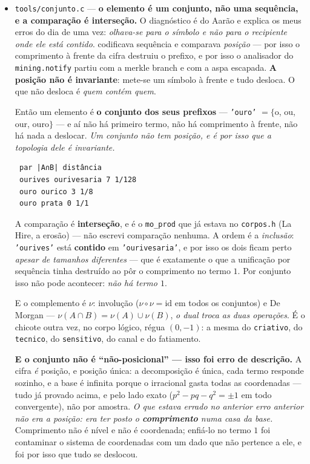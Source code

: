 \documentclass[11pt]{article}
\newcommand{\code}[1]{\texttt{\small #1}}
\theoremstyle{plain}
\theoremstyle{remark}
\begin{document}
\begin{itemize}
\item \code{tools/conjunto.c} --- \textbf{o elemento é um conjunto, não uma sequência, e a
comparação é interseção.} O diagnóstico é do Aarão e explica os meus erros do dia de uma vez:
\emph{olhava-se para o símbolo e não para o recipiente onde ele está contido}. codificava
sequência e comparava \emph{posição} --- por isso o comprimento à frente da cifra destruiu o
prefixo, e por isso o analisador do \code{mining.notify} partiu com a merkle branch e com a aspa
escapada. \textbf{A posição não é invariante}: mete-se um símbolo à frente e tudo desloca. O que
não desloca é \emph{quem contém quem}.

Então um elemento é \textbf{o conjunto dos seus prefixos} --- \code{'ouro'} $=\{$o, ou, our,
ouro$\}$ --- e aí não há primeiro termo, não há comprimento à frente, não há nada a deslocar.
\emph{Um conjunto não tem posição, e é por isso que a topologia dele é invariante.}

\begin{verbatim}
 par |A∩B| distância
 ourives ourivesaria 7 1/128
 ouro ourico 3 1/8
 ouro prata 0 1/1
\end{verbatim}

A comparação é \textbf{interseção}, e é o \code{mo\_prod} que já estava no \code{corpos.h} (La
Hire, a erosão) --- não escrevi comparação nenhuma. A ordem é a \emph{inclusão}: \code{'ourives'}
está \textbf{contido} em \code{'ourivesaria'}, e por isso os dois ficam perto \emph{apesar de
tamanhos diferentes} --- que é exatamente o que a unificação por sequência tinha destruído ao pôr
o comprimento no termo $1$. Por conjunto isso não pode acontecer: \emph{não há termo $1$}.

E o complemento é $\nu$: involução ($\nu\circ\nu=\mathrm{id}$ em todos os conjuntos) e De Morgan
--- $\nu(A\cap B) = \nu(A)\cup\nu(B)$, \emph{o dual troca as duas operações}. É o chicote outra
vez, no corpo lógico, régua $(0,-1)$: a mesma do \code{criativo}, do \code{tecnico}, do
\code{sensitivo}, do canal e do fatiamento.

\textbf{E o conjunto não é ``não-posicional'' --- isso foi erro de descrição.} A cifra
\emph{é} posição, e posição única: a decomposição é única, cada termo responde sozinho, e a base é
infinita porque o irracional gasta todas as coordenadas --- tudo já provado acima, e pelo lado
exato ($p^2-pq-q^2=\pm1$ em todo convergente), não por amostra. \emph{O que estava errado no anterior
erro anterior não era a posição: era ter posto o \textbf{comprimento} numa casa da base.}
Comprimento não é nível e não é coordenada; enfiá-lo no termo $1$ foi contaminar o sistema de
coordenadas com um dado que não pertence a ele, e foi por isso que tudo se deslocou.


\end{itemize}
\end{document}
